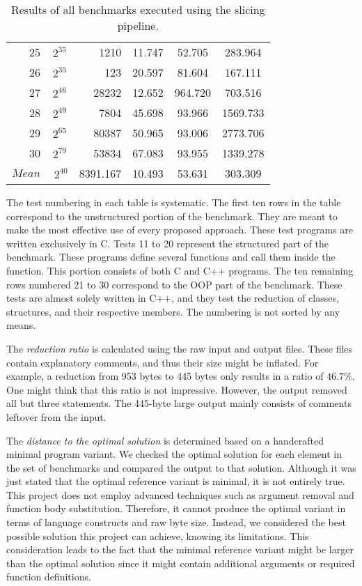 \begin{table}[b!]
\begin{tabular}{rSrSSS}
    25 & {$2^{35}$} & 1210 & 11.747 & 52.705 & 283.964 \\
    26 & {$2^{35}$} & 123 & 20.597 & 81.604 & 167.111 \\
    27 & {$2^{46}$} & 28232 & 12.652 & 964.720 & 703.516 \\
    28 & {$2^{49}$} & 7804 & 45.698 & 93.966 & 1569.733 \\
    29 & {$2^{65}$} & 80387 & 50.965 & 93.006 & 2773.706 \\
    30 & {$2^{79}$} & 53834 & 67.083 & 93.955 & 1339.278 \\	\midrule
	{$Mean$} & {$~2^{40}$} & 8391.167 & 10.493 & 53.631 & 303.309 \\	\bottomrule
\end{tabular}
\caption{Results of all benchmarks executed using the slicing pipeline.}
\label{tab:slicing}
\end{table}

The test numbering in each table is systematic. 
The first ten rows in the table correspond to the unstructured portion of 
the benchmark. 
They are meant to make the most effective use of every proposed approach. 
These test programs are written exclusively in C. 
Tests 11 to 20 represent the structured part of the benchmark. 
These programs define several functions and call them inside 
the  function. 
This portion consists of both C and C++ programs.
The ten remaining rows numbered 21 to 30 correspond to the OOP part of 
the benchmark. 
These tests are almost solely written in C++, and they test the reduction 
of classes, structures, and their respective members.
The numbering is not sorted by any means.

The \emph{reduction ratio} is calculated using the raw input and output 
files. 
These files contain explanatory comments, and thus their size might be 
inflated. 
For example, a reduction from 953 bytes to 445 bytes only results in a ratio 
of $46.7\%$. 
One might think that this ratio is not impressive. 
However, the output removed all but three statements. 
The 445-byte large output mainly consists of comments leftover from the input.

The \emph{distance to the optimal solution} is determined based on 
a handcrafted minimal program variant. 
We checked the optimal solution for each element in the set of benchmarks and 
compared the output to that solution. 
Although it was just stated that the optimal reference variant is minimal, 
it is not entirely true. 
This project does not employ advanced techniques such as argument removal 
and function body substitution. 
Therefore, it cannot produce the optimal variant in terms of language 
constructs and raw byte size. 
Instead, we considered the best possible solution this project can achieve, 
knowing its limitations. 
This consideration leads to the fact that the minimal reference variant 
might be larger than the optimal solution since it might contain additional 
arguments or required function definitions.

